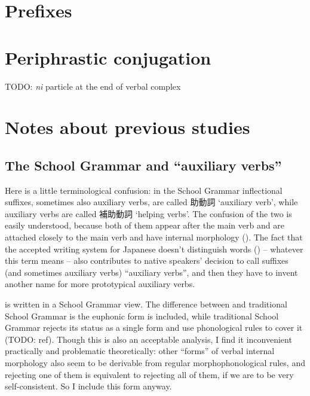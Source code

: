 \documentclass[UTF8, a4paper, oneside, scheme=plain]{ctexrep}
\newcommand{\corpus}[1]{\emph{#1}}
\newcommand{\translate}[1]{`#1'}
\begin{document}
\section{Prefixes}\label{sec:prefixes}


\section{Periphrastic conjugation}\label{sec:periphrastic}

TODO: \corpus{ni} particle at the end of verbal complex

\section{Notes about previous studies}\label{sec:verb-complex-previous}

\subsection{The School Grammar and ``auxiliary verbs''}\label{sec:so-called-auxiliary-verb}

Here is a little terminological confusion:
in the School Grammar inflectional suffixes,
sometimes also auxiliary verbs, are called 助動詞 \translate{auxiliary verb},
while auxiliary verbs are called 補助動詞 \translate{helping verbs}.
The confusion of the two is easily understood,
because both of them appear after the main verb
and are attached closely to the main verb 
and have internal morphology ().
The fact that the accepted writing system for Japanese doesn't distinguish words 
() -- whatever this term means -- 
also contributes to native speakers' decision to call suffixes (and sometimes auxiliary verbs) ``auxiliary verbs'',
and then they have to invent another name for more prototypical auxiliary verbs.

 is written in a School Grammar view.
The difference between  and traditional School Grammar 
is the euphonic form is included,
while traditional School Grammar rejects its status as a single form
and use phonological rules to cover it (TODO: ref).
Though this is also an acceptable analysis,
I find it inconvenient practically and problematic theoretically:
other ``forms'' of verbal internal morphology also seem to
be derivable from regular morphophonological rules,
and rejecting one of them is equivalent to rejecting all of them,
if we are to be very self-consistent.
So I include this form anyway.
\end{document}
